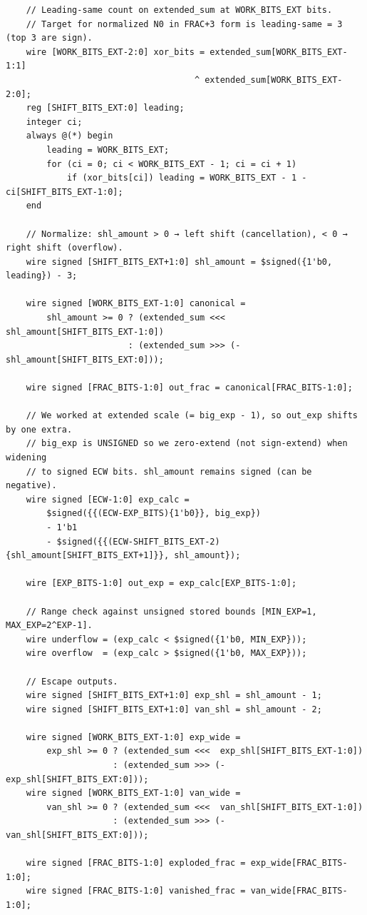 \documentclass[12pt,letter]{article}
\begin{document}
\begin{lstlisting}
    // Leading-same count on extended_sum at WORK_BITS_EXT bits.
    // Target for normalized N0 in FRAC+3 form is leading-same = 3 (top 3 are sign).
    wire [WORK_BITS_EXT-2:0] xor_bits = extended_sum[WORK_BITS_EXT-1:1]
                                     ^ extended_sum[WORK_BITS_EXT-2:0];
    reg [SHIFT_BITS_EXT:0] leading;
    integer ci;
    always @(*) begin
        leading = WORK_BITS_EXT;
        for (ci = 0; ci < WORK_BITS_EXT - 1; ci = ci + 1)
            if (xor_bits[ci]) leading = WORK_BITS_EXT - 1 - ci[SHIFT_BITS_EXT-1:0];
    end

    // Normalize: shl_amount > 0 → left shift (cancellation), < 0 → right shift (overflow).
    wire signed [SHIFT_BITS_EXT+1:0] shl_amount = $signed({1'b0, leading}) - 3;

    wire signed [WORK_BITS_EXT-1:0] canonical =
        shl_amount >= 0 ? (extended_sum <<<  shl_amount[SHIFT_BITS_EXT-1:0])
                        : (extended_sum >>> (-shl_amount[SHIFT_BITS_EXT:0]));

    wire signed [FRAC_BITS-1:0] out_frac = canonical[FRAC_BITS-1:0];

    // We worked at extended scale (= big_exp - 1), so out_exp shifts by one extra.
    // big_exp is UNSIGNED so we zero-extend (not sign-extend) when widening
    // to signed ECW bits. shl_amount remains signed (can be negative).
    wire signed [ECW-1:0] exp_calc =
        $signed({{(ECW-EXP_BITS){1'b0}}, big_exp})
        - 1'b1
        - $signed({{(ECW-SHIFT_BITS_EXT-2){shl_amount[SHIFT_BITS_EXT+1]}}, shl_amount});

    wire [EXP_BITS-1:0] out_exp = exp_calc[EXP_BITS-1:0];

    // Range check against unsigned stored bounds [MIN_EXP=1, MAX_EXP=2^EXP-1].
    wire underflow = (exp_calc < $signed({1'b0, MIN_EXP}));
    wire overflow  = (exp_calc > $signed({1'b0, MAX_EXP}));

    // Escape outputs.
    wire signed [SHIFT_BITS_EXT+1:0] exp_shl = shl_amount - 1;
    wire signed [SHIFT_BITS_EXT+1:0] van_shl = shl_amount - 2;

    wire signed [WORK_BITS_EXT-1:0] exp_wide =
        exp_shl >= 0 ? (extended_sum <<<  exp_shl[SHIFT_BITS_EXT-1:0])
                     : (extended_sum >>> (-exp_shl[SHIFT_BITS_EXT:0]));
    wire signed [WORK_BITS_EXT-1:0] van_wide =
        van_shl >= 0 ? (extended_sum <<<  van_shl[SHIFT_BITS_EXT-1:0])
                     : (extended_sum >>> (-van_shl[SHIFT_BITS_EXT:0]));

    wire signed [FRAC_BITS-1:0] exploded_frac = exp_wide[FRAC_BITS-1:0];
    wire signed [FRAC_BITS-1:0] vanished_frac = van_wide[FRAC_BITS-1:0];


\end{lstlisting}
\end{document}
